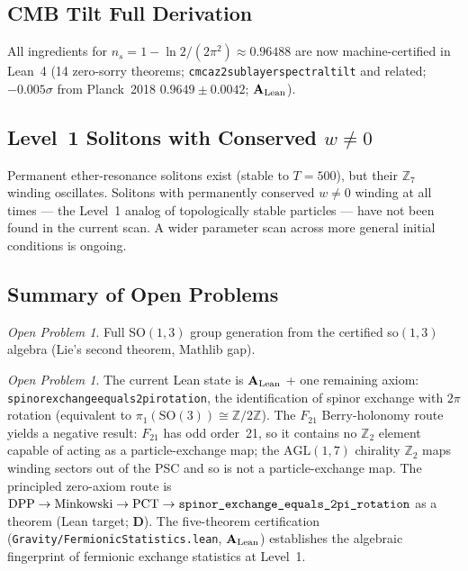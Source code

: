 \documentclass[11pt]{article}
\theoremstyle{remark}
\newtheorem{openprob}[theorem]{Open Problem}
\newcommand{\ZS}{\mathbb{Z}_7}
\newcommand{\lean}[1]{%
  \penalty-100
  \begingroup\def\_{\textunderscore\allowbreak}\texttt{#1}\endgroup}
\newcommand{\CatAL}{\ensuremath{\textbf{A}_{\rm Lean}}}
\newcommand{\CatD}{\textbf{D}}
\begin{document}
\subsection{CMB Tilt Full Derivation}

All ingredients for $n_s = 1 - \ln 2/(2\pi^2) \approx 0.96488$ are now
machine-certified in Lean~4 (14 zero-sorry theorems;
\lean{cmca\_z2\_sublayer\allowbreak\_spectral\_tilt} and related; $-0.005\sigma$ from
Planck~2018 $0.9649 \pm 0.0042$; $\CatAL$).

\subsection{Level~1 Solitons with Conserved \texorpdfstring{$w \neq 0$}{w≠0}}

Permanent ether-resonance solitons exist (stable to $T = 500$), but
their $\ZS$ winding oscillates. Solitons with permanently conserved
$w \neq 0$ winding at all times — the Level~1 analog of topologically
stable particles — have not been found in the current scan. A wider
parameter scan across more general initial conditions is ongoing.

\subsection{Summary of Open Problems}

\begin{openprob}
Full SO$(1,3)$ group generation from the certified so$(1,3)$ algebra
(Lie's second theorem, Mathlib gap).
\end{openprob}

\begin{openprob}
The current Lean state is $\CatAL$ + one remaining axiom:
\lean{spinor\_exchange\_equals\_2pi\_rotation}, the identification of spinor
exchange with $2\pi$ rotation (equivalent to $\pi_1(\mathrm{SO}(3)) \cong \mathbb{Z}/2\mathbb{Z}$).
The $F_{21}$ Berry-holonomy route yields a negative result: $F_{21}$ has odd order~21,
so it contains no $\mathbb{Z}_2$ element capable of acting as a particle-exchange map;
the $\mathrm{AGL}(1,7)$ chirality $\mathbb{Z}_2$ maps winding sectors out of the PSC
and so is not a particle-exchange map.  The principled zero-axiom route is
$\mathrm{DPP} \to \text{Minkowski} \to \text{PCT} \to \lean{spinor\_exchange\_equals\_2pi\_rotation}$
as a theorem (Lean target; $\CatD$).  The five-theorem certification
(\texttt{Gravity/FermionicStatistics.lean}, $\CatAL$) establishes the algebraic
fingerprint of fermionic exchange statistics at Level~1.
\end{openprob}
\end{document}
